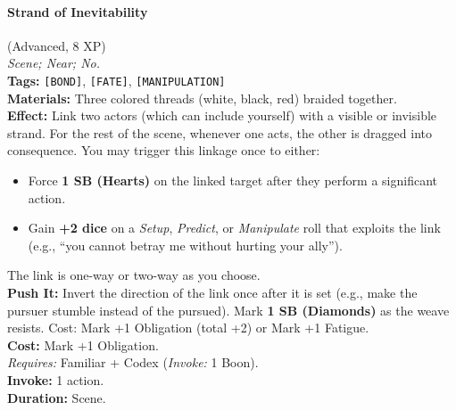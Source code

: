 \paragraph{Strand of Inevitability} (Advanced, 8 XP) \hfill \\
\emph{Scene; Near; No.} \\
\textbf{Tags:} \texttt{[BOND]}, \texttt{[FATE]}, \texttt{[MANIPULATION]} \\
\textbf{Materials:} Three colored threads (white, black, red) braided together. \\
\textbf{Effect:} Link two actors (which can include yourself) with a visible or invisible strand. For the rest of the scene, whenever one acts, the other is dragged into consequence. You may trigger this linkage once to either:
\begin{itemize}
  \item Force \textbf{1 SB (Hearts)} on the linked target after they perform a significant action.
  \item Gain \textbf{+2 dice} on a \textit{Setup}, \textit{Predict}, or \textit{Manipulate} roll that exploits the link (e.g., ``you cannot betray me without hurting your ally'').
\end{itemize}
The link is one-way or two-way as you choose. \\
\textbf{Push It:} Invert the direction of the link once after it is set (e.g., make the pursuer stumble instead of the pursued). Mark \textbf{1 SB (Diamonds)} as the weave resists. Cost: Mark +1 Obligation (total +2) or Mark +1 Fatigue. \\
\textbf{Cost:} Mark +1 Obligation. \\
\textit{Requires:} Familiar + Codex (\textit{Invoke:} 1 Boon). \\
\textbf{Invoke:} 1 action. \\
\textbf{Duration:} Scene.

